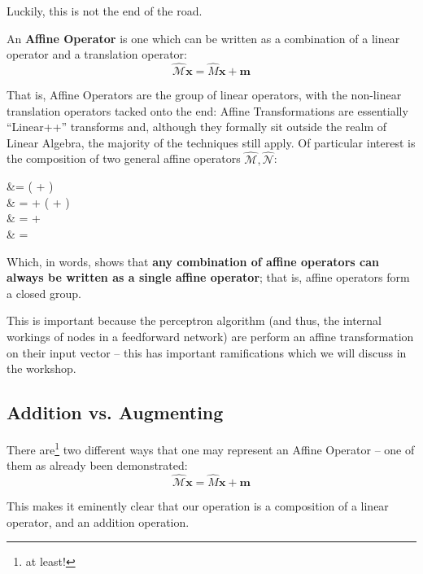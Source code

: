 \documentclass[a4paper,openany,11pt]{book}
\renewcommand\vec[1]{\boldsymbol{\mathbf{#1}}}
\begin{document}
					Luckily, this is not the end of the road. 

					An \textbf{Affine Operator} is one which can be written as a combination of a linear operator and a translation operator:
					\begin{equation}
						\hat{\mathcal{M}} \vec{x} = \hat{M} \vec{x} + \vec{m}
					\end{equation}

					That is, Affine Operators are the group of linear operators, with the non-linear translation operators tacked onto the end: Affine Transformations are essentially ``Linear++'' transforms and, although they formally sit outside the realm of Linear Algebra, the majority of the techniques still apply. Of particular interest is the composition of two general affine operators $\hat{\mathcal{M}}, \hat{\mathcal{N}}$:

					\begin{spalign}
						  \vec{x} &=  \left(  \vec{x} + \vec{n} \right)
						\\
						& = \hat{M}  \vec{x} + \left( \vec{n} + \vec{m}\right)
						\\
						& =  \vec{x} + \vec{p} 
						\\
						& =  \vec{x}
					\end{spalign}
					Which, in words, shows that \textbf{any combination of affine operators can always be written as a single affine operator}; that is, affine operators form a closed group.

					This is important because the perceptron algorithm (and thus, the internal workings of nodes in a feedforward network) are perform an affine transformation on their input vector -- this has important ramifications which we will discuss in the workshop.

					\subsection{Addition vs. Augmenting}

						There are\footnote{at least!} two different ways that one may represent an Affine Operator -- one of them as already been demonstrated:
						\begin{equation}
							\hat{\mathcal{M}} \vec{x} = \hat{M} \vec{x} + \vec{m} 
						\end{equation}

						This makes it eminently clear that our operation is a composition of a linear operator, and an addition operation. 
\end{document}
